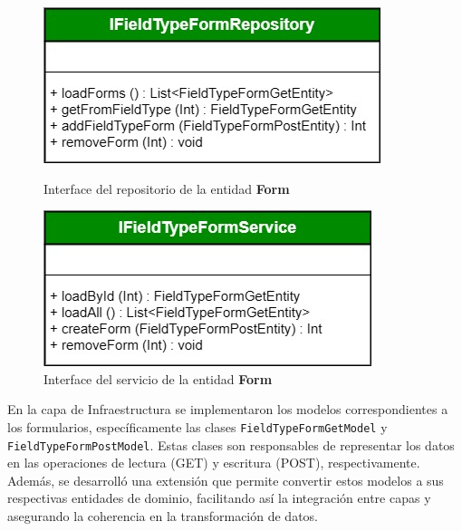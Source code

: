 \documentclass[12pt, a4paper]{book}
\begin{document}
\begin{figure}[H]
  \centering
  \begin{minipage}[b]{0.45\textwidth}
    \centering
    \includegraphics[width=\textwidth]{images/iform_repo.jpg}
    \caption{Interface del repositorio de la entidad \textbf{Form}}
    \label{fig:iformrepo}
  \end{minipage}
  \hspace{0.02\textwidth}
  \begin{minipage}[b]{0.45\textwidth}
    \centering
    \includegraphics[width=\textwidth]{images/iformservice.jpg}
    \caption{Interface del servicio de la entidad \textbf{Form}}
    \label{fig:formservice}
  \end{minipage}
\end{figure}

En la capa de Infraestructura se implementaron los modelos correspondientes a los formularios, específicamente las clases \texttt{FieldTypeFormGetModel} y \texttt{FieldTypeFormPostModel}. Estas clases son responsables de representar los datos en las operaciones de lectura (GET) y escritura (POST), respectivamente. Además, se desarrolló una extensión que permite convertir estos modelos a sus respectivas entidades de dominio, facilitando así la integración entre capas y asegurando la coherencia en la transformación de datos.
\end{document}
